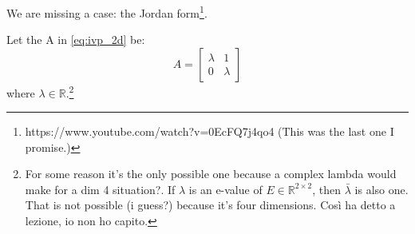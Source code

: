 We are missing a case: the Jordan form\footnote{https://www.youtube.com/watch?v=0EcFQ7j4qo4 (This was the last one I promise.)}.
\begin{example}
    Let the A in \autoref{eq:ivp_2d} be:
    \begin{equation*}
        A=\begin{bmatrix}
        \lambda & 1 \\ 0 & \lambda
    \end{bmatrix}
    \end{equation*}
    where $\lambda\in\mathbb{R}$.\footnote{For some reason it's the only possible one because a complex lambda would make for a dim 4 situation?. If $\lambda$ is an e-value of $E\in\mathbb{R}^{2\times2}$, then $\bar{\lambda}$ is also one. That is not possible (i guess?) because it's four dimensions. Così ha detto a lezione, io non ho capito.}


\end{example}
